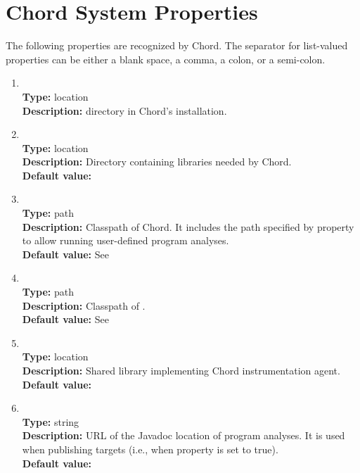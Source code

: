 \section{Chord System Properties}
\label{sec:chord-sysprops}

The following properties are recognized by Chord.
The separator for list-valued properties can be either a blank space, a comma, a colon, or a semi-colon.

\begin{enumerate}
\item
{} \\
{\bf Type:} location \\
{\bf Description:}  directory in Chord's installation.

\item
{} \\
{\bf Type:} location \\
{\bf Description:} Directory containing libraries needed by Chord. \\
{\bf Default value:} 

\item
{} \\
{\bf Type:} path \\
{\bf Description:} Classpath of Chord.  It includes the path specified by property  to allow running user-defined program analyses. \\
{\bf Default value:} See  

\item
{} \\
{\bf Type:} path \\
{\bf Description:} Classpath of . \\
{\bf Default value:} See  

\item
{} \\
{\bf Type:} location \\
{\bf Description:} Shared library implementing Chord instrumentation agent. \\
{\bf Default value:}  

\item
{} \\
{\bf Type:} string \\
{\bf Description:} URL of the Javadoc location of program analyses.  It is used when publishing targets (i.e., when property  is set to true). \\
{\bf Default value:} 


\end{enumerate}
